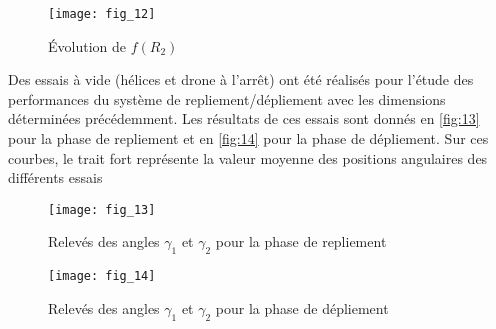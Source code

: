 \begin{figure}[H]
\centering
\texttt{[image: fig\_12]}
\caption{\label{fig:12} Évolution de $f(R_2)$}
\end{figure}

\ifprof
\begin{corrige}
\end{corrige}
\else
\fi

Des essais à vide (hélices et drone à l’arrêt) ont été réalisés pour l’étude des performances
du système de repliement/dépliement avec les dimensions déterminées précédemment. Les
résultats de ces essais sont donnés en \autoref{fig:13} pour la phase de repliement et en \autoref{fig:14}
pour la phase de dépliement. Sur ces courbes, le trait fort représente la valeur moyenne des
positions angulaires des différents essais


\begin{figure}[H]
\centering
\texttt{[image: fig\_13]}
\caption{\label{fig:13} Relevés des angles $\gamma_1$ et $\gamma_2$ pour la phase de repliement}
\end{figure}

\begin{figure}[H]
\centering
\texttt{[image: fig\_14]}
\caption{\label{fig:14} Relevés des angles $\gamma_1$ et $\gamma_2$ pour la phase de dépliement}
\end{figure}

\ifprof
\begin{corrige}
\end{corrige}
\else
\fi

\ifprof
\begin{corrige}
\end{corrige}
\else
\fi
